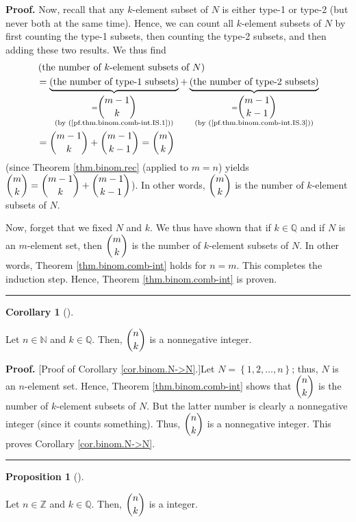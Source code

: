 \documentclass[numbers=enddot,12pt,final,onecolumn,notitlepage]{scrartcl}%
\numberwithin{exer}{subsection}
\theoremstyle{definition}
\newtheorem{prop}[theo]{Proposition}
\newenvironment{proposition}[1][]
{\begin{prop}[#1]\begin{leftbar}}
{\end{leftbar}\end{prop}}
\newtheorem{coro}[theo]{Corollary}
\newenvironment{corollary}[1][]
{\begin{coro}[#1]\begin{leftbar}}
{\end{leftbar}\end{coro}}
\newenvironment{proof}[1][Proof]{\noindent\textbf{#1.} }{\ \rule{0.5em}{0.5em}}
\begin{document}
\begin{proof}
Now, recall that any $k$-element subset of $N$ is either type-1 or type-2 (but
never both at the same time). Hence, we can count all $k$-element subsets of
$N$ by first counting the type-1 subsets, then counting the type-2 subsets,
and then adding these two results. We thus find%
\begin{align*}
&  \left(  \text{the number of }k\text{-element subsets of }N\right) \\
&  =\underbrace{\left(  \text{the number of type-1 subsets}\right)
}_{\substack{=\dbinom{m-1}{k}\\\text{(by (\ref{pf.thm.binom.comb-int.IS.1}))}%
}}+\underbrace{\left(  \text{the number of type-2 subsets}\right)
}_{\substack{=\dbinom{m-1}{k-1}\\\text{(by (\ref{pf.thm.binom.comb-int.IS.3}%
))}}}\\
&  =\dbinom{m-1}{k}+\dbinom{m-1}{k-1}=\dbinom{m}{k}%
\end{align*}
(since Theorem \ref{thm.binom.rec} (applied to $m=n$) yields $\dbinom{m}%
{k}=\dbinom{m-1}{k}+\dbinom{m-1}{k-1}$). In other words, $\dbinom{m}{k}$ is
the number of $k$-element subsets of $N$.

Now, forget that we fixed $N$ and $k$. We thus have shown that if
$k\in\mathbb{Q}$ and if $N$ is an $m$-element set, then $\dbinom{m}{k}$ is the
number of $k$-element subsets of $N$. In other words, Theorem
\ref{thm.binom.comb-int} holds for $n=m$. This completes the induction step.
Hence, Theorem \ref{thm.binom.comb-int} is proven.
\end{proof}

\begin{corollary}
\label{cor.binom.N->N}Let $n\in\mathbb{N}$ and $k\in\mathbb{Q}$. Then,
$\dbinom{n}{k}$ is a nonnegative integer.
\end{corollary}

\begin{proof}
[Proof of Corollary \ref{cor.binom.N->N}.]Let $N=\left\{  1,2,\ldots
,n\right\}  $; thus, $N$ is an $n$-element set. Hence, Theorem
\ref{thm.binom.comb-int} shows that $\dbinom{n}{k}$ is the number of
$k$-element subsets of $N$. But the latter number is clearly a nonnegative
integer (since it counts something). Thus, $\dbinom{n}{k}$ is a nonnegative
integer. This proves Corollary \ref{cor.binom.N->N}.
\end{proof}

\begin{proposition}
\label{prop.binom.Z->Z}Let $n\in\mathbb{Z}$ and $k\in\mathbb{Q}$. Then,
$\dbinom{n}{k}$ is a integer.
\end{proposition}
\end{document}
